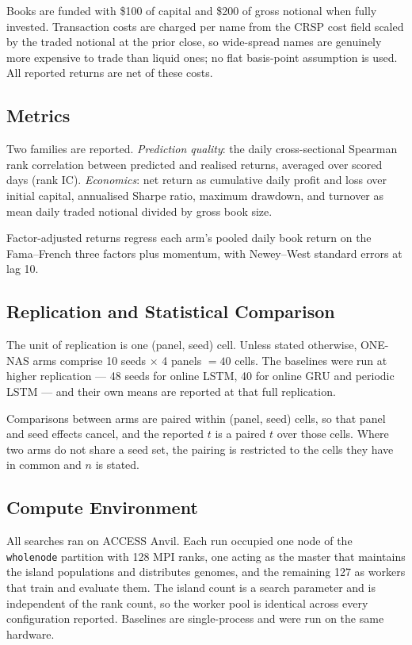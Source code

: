 Books are funded with \$100 of capital and \$200 of gross notional when
fully invested. Transaction costs are charged per name from the CRSP
cost field scaled by the traded notional at the prior close, so
wide-spread names are genuinely more expensive to trade than liquid ones;
no flat basis-point assumption is used. All reported returns are net of
these costs.

\subsection{Metrics}

Two families are reported. \emph{Prediction quality}: the daily
cross-sectional Spearman rank correlation between predicted and realised
returns, averaged over scored days (rank IC). \emph{Economics}: net return
as cumulative daily profit and loss over initial capital, annualised
Sharpe ratio, maximum drawdown, and turnover as mean daily traded notional
divided by gross book size.

Factor-adjusted returns regress each arm's pooled daily book return on the
Fama--French three factors plus momentum, with Newey--West standard errors
at lag 10.

\subsection{Replication and Statistical Comparison}

The unit of replication is one (panel, seed) cell. Unless stated
otherwise, ONE-NAS arms comprise 10 seeds $\times$ 4 panels $=40$ cells.
The baselines were run at higher replication --- 48 seeds for online LSTM,
40 for online GRU and periodic LSTM --- and their own means are reported
at that full replication.

Comparisons between arms are paired within (panel, seed) cells, so that
panel and seed effects cancel, and the reported $t$ is a paired $t$ over
those cells. Where two arms do not share a seed set, the pairing is
restricted to the cells they have in common and $n$ is stated.

\subsection{Compute Environment}

All searches ran on ACCESS Anvil. Each run occupied one node of the
\texttt{wholenode} partition with 128 MPI ranks, one acting as the master
that maintains the island populations and distributes genomes, and the
remaining 127 as workers that train and evaluate them. The island count
is a search parameter and is independent of the rank count, so the worker
pool is identical across every configuration reported. Baselines are
single-process and were run on the same hardware.


